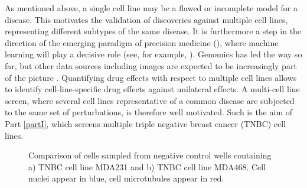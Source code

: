 As mentioned above, a single cell line may be a flawed or incomplete model for a disease. This motivates the validation of discoveries against multiple cell lines, representing different subtypes of the same disease. It is furthermore a step in the direction of the emerging paradigm of precision medicine (\cite{ashley2016towards}), where machine learning will play a decisive role (see, for example, \cite{krittanawong2017artificial}). Genomics has led the way so far, but other data sources including images are expected to be increasingly part of the picture \cite{hulsen2019big}. Quantifying drug effects with respect to multiple cell lines allows to identify cell-line-specific drug effects against unilateral effects. A multi-cell line screen, where several cell lines representative of a common disease are subjected to the same set of perturbations, is therefore well motivated. Such is the aim of Part \ref{partI}, which screens multiple triple negative breast cancer (TNBC) cell lines.

\begin{figure}%
    \centering
    \qquad
	\caption{Comparison of cells sampled from negative control wells containing a) TNBC cell line MDA231 and b) TNBC cell line MDA468. Cell nuclei appear in blue, cell microtubules appear in red.}
    \label{fig:cell_line_morphologies}%
\end{figure}

